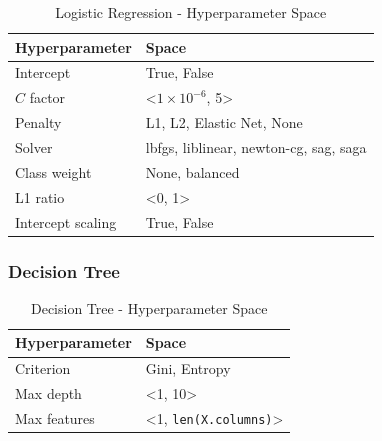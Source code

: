         \begin{table}[H]
            \small
            \setlength{\tabcolsep}{8pt}
            \renewcommand{\arraystretch}{1.3}
            \centering
                \caption[Logistic Regression - Hyperparameter Space]{Logistic Regression - Hyperparameter Space}\label{tab:lrspace}
                \begin{tabular}{ll}
            \toprule
            \textbf{Hyperparameter} & \textbf{Space}\\
            \midrule
            \hline
            Intercept & True, False \\
            $C$ factor & <$1\times10^{-6}$, 5>\\
            Penalty & L1, L2, Elastic Net, None \\
            Solver & lbfgs, liblinear, newton-cg, sag, saga \\
            Class weight & None, balanced \\
            L1 ratio & <0, 1> \\
            Intercept scaling & True, False  \\
            \hline
            \bottomrule
            \end{tabular}
            \vspace{0.7em}
        
            \vspace{-1em}
        \end{table}
        
        
        \subsubsection{Decision Tree}
        \begin{table}[H]
            \small
            \setlength{\tabcolsep}{8pt}
            \renewcommand{\arraystretch}{1.3}
            \centering
                \caption[Decision Tree - Hyperparameter Space]{Decision Tree - Hyperparameter Space}\label{tab:dtspace}
                \begin{tabular}{ll}
            \toprule
            \textbf{Hyperparameter} & \textbf{Space}\\
            \midrule
            \hline
            Criterion & Gini, Entropy \\
            Max depth & <1, 10> \\
            Max features & <1, \verb|len(X.columns)|>  \\
            \hline
            \bottomrule
            \end{tabular}
            \vspace{0.7em}
        
            \vspace{-1em}
        \end{table}
        
